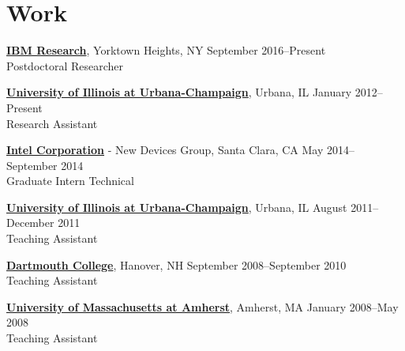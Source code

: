 
\section{\sc Work}
{\href{http://www.research.ibm.com/}{{\bf IBM Research}}}, Yorktown Heights, NY \hfill September 2016--Present\\
Postdoctoral Researcher
\vspace{-0.16cm}

{\href{http://www.illinois.edu/}{{\bf University of Illinois at Urbana-Champaign}}}, Urbana, IL \hfill January 2012--Present\\
Research Assistant
\vspace{-0.16cm}

{\href{http://www.intel.com/}{{\bf Intel Corporation}}} - New Devices Group, Santa Clara, CA \hfill May 2014--September 2014\\
Graduate Intern Technical
\vspace{-0.16cm}

{\href{http://www.illinois.edu/}{{\bf University of Illinois at Urbana-Champaign}}}, Urbana, IL \hfill August 2011--December 2011\\
Teaching Assistant
\vspace{-0.16cm}

{\href{http://www.dartmouth.edu/}{{\bf Dartmouth College}}}, Hanover, NH \hfill September 2008--September 2010\\
Teaching Assistant
\vspace{-0.16cm}

{\href{http://www.umass.edu/}{{\bf University of Massachusetts at Amherst}}}, Amherst, MA \hfill January 2008--May 2008\\
Teaching Assistant
